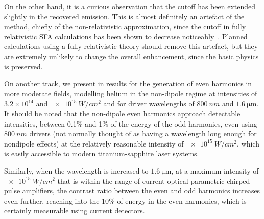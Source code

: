 On the other hand, it is a curious observation that the cutoff has been extended slightly in the recovered emission. This is almost definitely an artefact of the method, chiefly of the non-relativistic approximation, since the cutoff in fully relativistic SFA calculations has been shown to decrease noticeably~\cite{milosevic_relativistic_2002-1}. Planned calculations using a fully relativistic theory should remove this artefact, but they are extremely unlikely to change the overall enhancement, since the basic physics is preserved.



On another track, we present in  results for the generation of even harmonics in more moderate fields, modelling helium in the non-dipole regime at intensities of $3.2\times 10^{14}$ and $\SI{e15}{W/cm^2}$ and for driver wavelengths of $\SI{800}{nm}$ and $\SI{1.6}{\micro\metre}$. It should be noted that the non-dipole even harmonics approach detectable intensities, between 0.1\% and 1\% of the energy of the odd harmonics, even using $\SI{800}{nm}$ drivers (not normally thought of as having a wavelength long enough for nondipole effects) at the relatively reasonable intensity of $\SI{e15}{W/cm^2}$, which is easily accessible to modern titanium-sapphire laser systems.


Similarly, when the wavelength is increased to $\SI{1.6}{\micro\metre}$, at a maximum intensity of $\SI{e15}{W/cm^2}$ that is within the range of current optical parametric chirped-pulse amplifiers, the contrast ratio between the even and odd harmonics increases even further, reaching into the 10\% of energy in the even harmonics, which is certainly measurable using current detectors.


